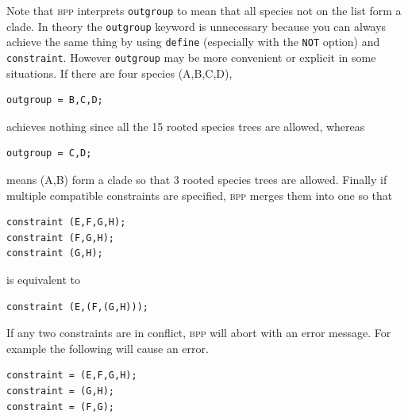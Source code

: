 \documentclass[a4paper]{book}
\numberwithin{equation}{section} \renewcommand{\baselinestretch}{0.55}
\begin{document}
Note that \textsc{bpp} interprets \texttt{outgroup} to mean that all
species not on the list form a clade. In theory the \texttt{outgroup}
keyword is unnecessary because you can always achieve the same thing
by using \texttt{define} (especially with the \texttt{NOT} option) and
\texttt{constraint}. However \texttt{outgroup} may be more convenient
or explicit in some situations. If there are four species
(A,B,C,D),
\begin{verbatim}
outgroup = B,C,D;
\end{verbatim}
achieves nothing since all the 15 rooted species trees are allowed,
whereas
\begin{verbatim}
outgroup = C,D;
\end{verbatim}
means (A,B) form a clade so that 3 rooted species trees are allowed.
Finally if multiple compatible constraints are specified, \textsc{bpp}
merges them into one so that
\begin{verbatim}
constraint (E,F,G,H);
constraint (F,G,H);
constraint (G,H);
\end{verbatim}
is equivalent to
\begin{verbatim}
constraint (E,(F,(G,H)));
\end{verbatim}
If any two constraints are in conflict, \textsc{bpp} will abort with
an error message. For example the following will cause an error.
\begin{verbatim}
constraint = (E,F,G,H);
constraint = (G,H);
constraint = (F,G);
\end{verbatim}
\end{document}
